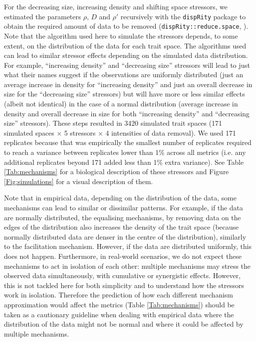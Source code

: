 \documentclass[12pt,letterpaper]{article}
\begin{document}
For the decreasing size, increasing density and shifting space stressors, we estimated the parameters $\rho$, $D$ and $\rho'$ recursively with the \texttt{dispRity} package to obtain the required amount of data to be removed (\texttt{dispRity::reduce.space}, \citealt{guillerme2018disprity,guillerme2020shifting}).
Note that the algorithm used here to simulate the stressors depends, to some extent, on the distribution of the data for each trait space.
The algorithms used can lead to similar stressor effects depending on the simulated data distribution.
For example, ``increasing density'' and ``decreasing size'' stressors will lead to just what their names suggest if the observations are uniformly distributed (just an average increase in density for ``increasing density'' and just an overall decrease in size for the ``decreasing size'' stressors) but will have more or less similar effects (albeit not identical) in the case of a normal distribution (average increase in density and overall decrease in size for both ``increasing density'' and ``decreasing size'' stressors).
These steps resulted in 3420 simulated trait spaces (171 simulated spaces $\times$ 5 stressors $\times$ 4 intensities of data removal).
We used 171 replicates because that was empirically the smallest number of replicates required to reach a variance between replicates lower than 1\% across all metrics (i.e. any additional replicates beyond 171 added less than 1\% extra variance).
See Table \ref{Tab:mechanisms} for a biological description of these stressors and Figure \ref{Fig:simulations} for a visual description of them.

Note that in empirical data, depending on the distribution of the data, some mechanisms can lead to similar or dissimilar patterns.
For example, if the data are normally distributed, the equalising mechanisms, by removing data on the edges of the distribution also increases the density of the trait space (because normally distributed data are denser in the centre of the distribution), similarly to the facilitation mechanism.
However, if the data are distributed uniformly, this does not happen.
Furthermore, in real-world scenarios, we do not expect these mechanisms to act in isolation of each other: multiple mechanisms may stress the observed data simultaneously, with cumulative or synergistic effects.
However, this is not tackled here for both simplicity and to understand how the stressors work in isolation. 
Therefore the prediction of how each different mechanism approximation would affect the metrics (Table \ref{Tab:mechanisms}) should be taken as a cautionary guideline when dealing with empirical data where the distribution of the data might not be normal and where it could be affected by multiple mechanisms.
\end{document}

